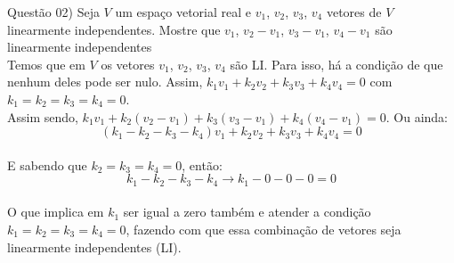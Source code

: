 
\noindent \textcolor{COLOR1}{Questão 02)} Seja $V$ um espaço vetorial real e $v_1$, $v_2$, $v_3$, $v_4$ vetores de $V$ linearmente independentes. Mostre que $v_1$, $v_2-v_1$, $v_3-v_1$, $v_4-v_1$ são linearmente independentes
\\

Temos que em $V$ os vetores $v_1$, $v_2$, $v_3$, $v_4$ são LI. Para isso, há a condição de que nenhum deles pode ser nulo. Assim, $k_1v_1+ k_2v_2 + k_3v_3 + k_4v_4 = 0 $ com $k_1=k_2=k_3=k_4=0$.
\\

Assim sendo, $k_1v_1+k_2(v_2-v_1)+k_3(v_3-v_1) + k_4(v_4-v_1)=0$. Ou ainda:
\\

\[
    (k_1-k_2-k_3-k_4)v_1 + k_2v_2 + k_3v_3 + k_4v_4 = 0
\]
\\

E sabendo que $k_2=k_3=k_4=0$, então:
\\

\[
    k_1-k_2-k_3-k_4\to k_1-0-0-0=0
\]
\\

O que implica em $k_1$ ser igual a zero também e atender a condição $k_1=k_2=k_3=k_4=0$, fazendo com que essa combinação de vetores seja linearmente independentes (LI).